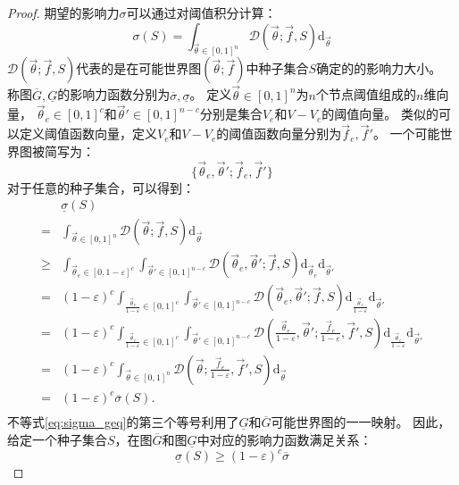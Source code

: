 \begin{proof}
期望的影响力$\sigma$可以通过对阈值积分计算：
$$\sigma(S)=\int_{\vec{\theta}\in[0,1]^n} \mathcal{D}(\vec{\theta};\vec{f},S) \mbox{d}_{\vec{\theta}}$$
$\mathcal{D}(\vec{\theta};\vec{f},S)$代表的是在可能世界图$(\vec{\theta};\vec{f})$中种子集合$S$确定的的影响力大小。
称图$\overline{G},\underline{G}$的影响力函数分别为$\overline{\sigma},\underline{\sigma}$。
定义$\vec{\theta}\in[0,1]^n$为$n$个节点阈值组成的$n$维向量，
$\vec{\theta}_e \in[0,1]^{c}$和$\vec{\theta}'\in[0,1]^{n-c}$分别是集合$V_e$和$V-V_e$的阈值向量。
类似的可以定义阈值函数向量，定义$V_e$和$V-V_e$的阈值函数向量分别为$\vec{f}_e,\vec{f}'$。
一个可能世界图被简写为：
$$\{\vec{\theta}_e,\vec{\theta}';\vec{f}_e,\vec{f}'\}$$
对于任意的种子集合，可以得到：
\begin{equation}
\label{eq:sigma_geq}
\begin{array}{ll}
&\underline{\sigma}(S)\\
=&\int_{\vec{\theta}\in[0,1]^n} \mathcal{D}(\vec{\theta};\vec{f},S) \mbox{d}_{\vec{\theta}} \\
\geq&\int_{\vec{\theta}_e\in[0,1-\varepsilon]^c}\int_{\vec{\theta}'\in[0,1]^{n-c}} \mathcal{D}(\vec{\theta}_e,\vec{\theta}';\vec{f},S) \mbox{d}_{\vec{\theta}_e}\mbox{d}_{\vec{\theta}'} \\
=&(1-\varepsilon)^c \int_{\frac{\vec{\theta}_e}{1-\varepsilon}\in[0,1]^c}\int_{\vec{\theta}'\in[0,1]^{n-c}} \mathcal{D}(\vec{\theta}_e,\vec{\theta}';\vec{f},S) \mbox{d}_{\frac{\vec{\theta}_e}{1-\varepsilon}}\mbox{d}_{\vec{\theta}'} \\
=&(1-\varepsilon)^c \int_{\frac{\vec{\theta}_e}{1-\varepsilon}\in[0,1]^c}\int_{\vec{\theta}'\in[0,1]^{n-c}} \mathcal{D}(\frac{\vec{\theta}_e}{1-\varepsilon},\vec{\theta}';\frac{\vec{f}_e}{1-\varepsilon},\vec{f}',S) \mbox{d}_{\frac{\vec{\theta}_e}{1-\varepsilon}}\mbox{d}_{\vec{\theta}'} \\
=&(1-\varepsilon)^c \int_{\vec{\theta}\in[0,1]^n} \mathcal{D}(\vec{\theta};\frac{\vec{f}_e}{1-\varepsilon},\vec{f}',S) \mbox{d}_{\vec{\theta}} \\
=&(1-\varepsilon)^c \overline{\sigma}(S).\\
\end{array}
\end{equation}
不等式\ref{eq:sigma_geq}的第三个等号利用了$\underline{G}$和$\overline{G}$可能世界图的一一映射。
因此，给定一个种子集合$S$，在图$\overline{G}$和图$\underline{G}$中对应的影响力函数满足关系：
$$\underline{\sigma}(S) \geq (1-\varepsilon)^c \overline{\sigma}$$




\end{proof}
